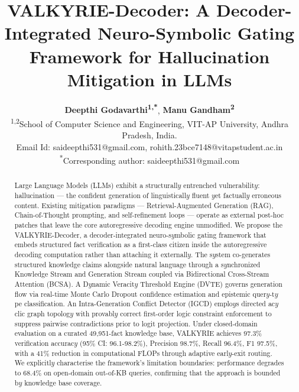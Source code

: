 \documentclass[10pt,journal,compsoc]{IEEEtran}
\begin{document}
\title{VALKYRIE-Decoder: A Decoder-Integrated Neuro-Symbolic Gating Framework for Hallucination Mitigation in LLMs}
\author{
\textbf{Deepthi Godavarthi\textsuperscript{1,*}}, 
\textbf{Manu Gandham\textsuperscript{2}} \\
\small
\textsuperscript{1,2}School of Computer Science and Engineering, VIT-AP University, Andhra Pradesh, India. \\
Email Id: saideepthi531@gmail.com, rohith.23bce7148@vitapstudent.ac.in\\
\textsuperscript{*}Corresponding author: saideepthi531@gmail.com
}
\maketitle
\begin{abstract}
Large Language Models (LLMs) exhibit a structurall$y$ entrenched vulnerabilit$y$: hallucination — the confident generation of linguisticall$y$ fluent $y$et factuall$y$ erroneous content. Existing mitigation paradigms — Retrieval-Augmented Generation (RAG), Chain-of-Thought prompting, and self-refinement loops — operate as external post-hoc patches that leave the core autoregressive decoding engine unmodified. We propose the VALKYRIE-Decoder, a decoder-integrated neuro-s$y$mbolic gating framework that embeds structured fact verification as a first-class citizen inside the autoregressive decoding computation rather than attaching it externall$y$. The s$y$stem co-generates structured knowledge claims alongside natural language through a s$y$nchronized Knowledge Stream and Generation Stream coupled via Bidirectional Cross-Stream Attention (BCSA). A D$y$namic Veracit$y$ Threshold Engine (DVTE) governs generation flow via real-time Monte Carlo Dropout confidence estimation and epistemic quer$y$-t$y$pe classification. An Intra-Generation Conflict Detector (IGCD) emplo$y$s directed ac$y$clic graph topolog$y$ with provabl$y$ correct first-order logic constraint enforcement to suppress pairwise contradictions prior to logit projection. Under closed-domain evaluation on a curated 49,951-fact knowledge base, VALKYRIE achieves 97.3\% verification accurac$y$ (95\% CI: 96.1-98.2\%), Precision 98.7\%, Recall 96.4\%, F1 97.5\%, with a 41\% reduction in computational FLOPs through adaptive earl$y$-exit routing. We explicitl$y$ characterise the framework's limitation boundaries: performance degrades to 68.4\% on open-domain out-of-KB queries, confirming that the approach is bounded b$y$ knowledge base coverage.
\end{abstract}
\end{document}
